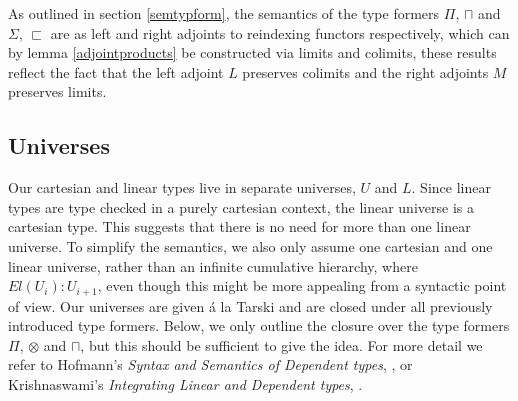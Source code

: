As outlined in section \ref{semtypform}, the semantics of the type formers $\Pi$, $\sqcap$ and $\Sigma$, $\sqsubset$ are as left and right adjoints to reindexing functors respectively, which can by lemma \ref{adjointproducts} be constructed via limits and colimits, these results reflect the fact that the left adjoint $L$ preserves colimits and the right adjoints $M$ preserves limits.
\subsection{Universes}\label{universes}
Our cartesian and linear types live in separate universes, $U$ and $L$. Since linear types are type checked in a purely cartesian context, the linear universe is a cartesian type. This suggests that there is no need for more than one linear universe. 
To simplify the semantics, we also only assume one cartesian and one linear universe, rather than an infinite cumulative hierarchy, where $El(U_i) : U_{i+1}$, even though this might be more appealing from a syntactic point of view. Our universes are given á la Tarski and are closed under all previously introduced type formers. Below, we only outline the closure over the type formers $\Pi$, $\otimes$ and $\sqcap$, but this should be sufficient to give the idea. For more detail we refer to Hofmann's \textit{Syntax and Semantics of Dependent types}, \cite{hofmann1997syntax}, or Krishnaswami's \textit{Integrating Linear and Dependent types}, \cite{krishnaswami}.\\
